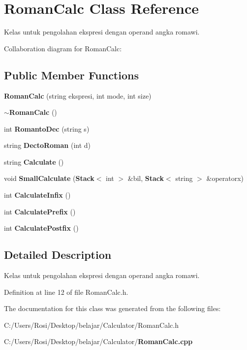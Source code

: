 \section{Roman\-Calc Class Reference}
\label{class_roman_calc}
Kelas untuk pengolahan ekspresi dengan operand angka romawi.  


Collaboration diagram for Roman\-Calc:\subsection*{Public Member Functions}
\begin{CompactItemize}
\item 
{\bf Roman\-Calc} (string ekspresi, int mode, int size)\label{class_roman_calc_98bbd4d6af013fbb7f7f5e282c0057ec}

\item 
{\bf $\sim$Roman\-Calc} ()\label{class_roman_calc_f7ab50c87dc838fdc30f1622d55948fd}

\item 
int {\bf Romanto\-Dec} (string s)\label{class_roman_calc_24cf3d90b3810d31bbde7af678eb8f9e}

\item 
string {\bf Decto\-Roman} (int d)\label{class_roman_calc_907493780cf78dc8e85d999c1a7d5556}

\item 
string {\bf Calculate} ()\label{class_roman_calc_ef3b608a0cfab3929e1afe02afe9e580}

\item 
void {\bf Small\-Calculate} ({\bf Stack}$<$ int $>$ \&bil, {\bf Stack}$<$ string $>$ \&operatorx)\label{class_roman_calc_0f8f717719f6e76b6680f44bd81bbd9f}

\item 
int {\bf Calculate\-Infix} ()\label{class_roman_calc_39a440cd99043f8ef3809d8191620779}

\item 
int {\bf Calculate\-Prefix} ()\label{class_roman_calc_968d7f0f8876ad0fb9a25576e0f0e7c6}

\item 
int {\bf Calculate\-Postfix} ()\label{class_roman_calc_81d5c7f43d3de276cafd11096ec6204c}

\end{CompactItemize}


\subsection{Detailed Description}
Kelas untuk pengolahan ekspresi dengan operand angka romawi. 



Definition at line 12 of file Roman\-Calc.h.

The documentation for this class was generated from the following files:\begin{CompactItemize}
\item 
C:/Users/Rosi/Desktop/belajar/Calculator/Roman\-Calc.h\item 
C:/Users/Rosi/Desktop/belajar/Calculator/{\bf Roman\-Calc.cpp}\end{CompactItemize}
